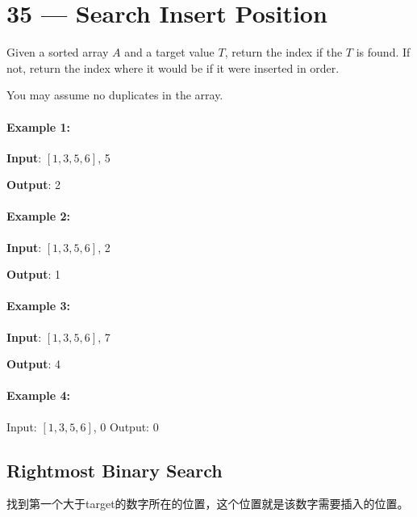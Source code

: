 \section{35 --- Search Insert Position}
Given a sorted array $A$ and a target value $T$, return the index if the $T$ is found. If not, return the index where it would be if it were inserted in order.

You may assume no duplicates in the array.

\paragraph{Example 1:}

\begin{flushleft}
\textbf{Input}: $[1,3,5,6]$, 5

\textbf{Output}: 2

\end{flushleft}

\paragraph{Example 2:}

\begin{flushleft}
\textbf{Input}: $[1,3,5,6]$, 2

\textbf{Output}: 1
\end{flushleft}

\paragraph{Example 3:}

\begin{flushleft}
\textbf{Input}: $[1,3,5,6]$, 7

\textbf{Output}: 4
\end{flushleft}

\paragraph{Example 4:}

\begin{flushleft}
Input: $[1,3,5,6]$, 0
Output: 0
\end{flushleft}

\subsection{Rightmost Binary Search}
找到第一个大于target的数字所在的位置，这个位置就是该数字需要插入的位置。

